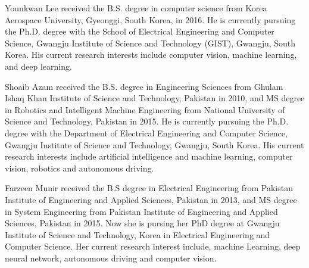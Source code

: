 \documentclass[journal]{IEEEtran}
\begin{document}
    \begin{IEEEbiography}{Younkwan Lee} received the B.S. degree in computer science from Korea Aerospace University, Gyeonggi, South Korea, in 2016. He is currently pursuing the Ph.D. degree with the School of Electrical Engineering and Computer Science, Gwangju Institute of Science and Technology (GIST), Gwangju, South Korea. His current research interests include computer vision, machine learning, and deep learning.
    \end{IEEEbiography}

    \begin{IEEEbiography}{Shoaib Azam} received the B.S. degree in Engineering Sciences from Ghulam Ishaq Khan Institute of Science and Technology, Pakistan in 2010, and MS degree in Robotics and Intelligent Machine Engineering from National University of Science and Technology, Pakistan in 2015. He is currently pursuing the Ph.D. degree with the Department of Electrical Engineering and Computer Science, Gwangju Institute of Science and Technology, Gwangju, South Korea. His current research interests include artificial intelligence and machine learning, computer vision, robotics and autonomous driving.
    \end{IEEEbiography}
    
    \begin{IEEEbiography}{Farzeen Munir} received the B.S degree in Electrical
Engineering from Pakistan Institute of Engineering and Applied Sciences, Pakistan in 2013, and MS degree in System Engineering from Pakistan Institute of Engineering and Applied Sciences, Pakistan in 2015. Now she is pursing her PhD degree at Gwangju Institute of Science and Technology, Korea in Electrical Engineering and Computer Science. Her current research interest include, machine Learning, deep neural network, autonomous driving and computer vision.
    \end{IEEEbiography}
\end{document}
